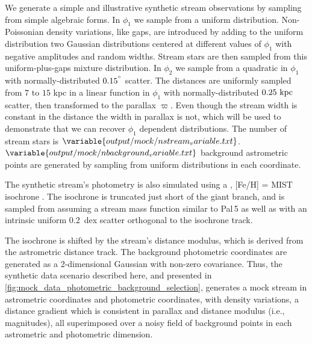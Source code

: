 \documentclass[twocolumn]{aastex631}
\newcommand{\stream}[1]{#1}
\newcommand{\parallax}{\varpi}
\begin{document}
        We generate a simple and illustrative synthetic stream observations by
        sampling from simple algebraic forms.  In $\phi_1$ we sample from a
        uniform distribution. Non-Poissonian density variations, like gaps, are
        introduced by adding to the uniform distribution two Gaussian
        distributions centered at different values of $\phi_1$ with negative
        amplitudes and random widths. Stream stars are then sampled from this
        uniform-plus-gaps mixture distribution.  In $\phi_2$ we sample from a
        quadratic in $\phi_1$ with normally-distributed $0.15^{\degree}$
        scatter.  The distances are uniformly sampled from $7$ to $15$ kpc in a
        linear function in $\phi_1$ with normally-distributed $0.25 \ \rm{kpc}$
        scatter, then transformed to the parallax $\parallax$. Even though the
        stream width is constant in the distance the width in parallax is not,
        which will be used to demonstrate that we can recover $\phi_1$ dependent
        distributions.  The number of stream stars is
        $\variable{output/mock/nstream_variable.txt}$.
        $\variable{output/mock/nbackground_variable.txt}$ background astrometric
        points are generated by sampling from uniform distributions in each
        coordinate.
    
        The synthetic stream's photometry is also simulated using a
        \unskip, [Fe/H] =
         MIST isochrone
        \citep{Dotter2016, Choi+2016,brutus}. The isochrone is truncated just
        short of the giant branch, and is sampled from assuming a stream mass
        function similar to \stream{Pal\,5} \citep{GrillmairSmith2001} as well
        as with an intrinsic uniform 0.2~dex scatter orthogonal to the isochrone
        track.

        The isochrone is shifted by the stream's distance modulus, which is
        derived from the astrometric distance track.  The background photometric
        coordinates are generated as a 2-dimensional Gaussian with non-zero
        covariance.  Thus, the synthetic data scenario described here, and
        presented in \autoref{fig:mock_data_photometric_background_selection},
        generates a mock stream in astrometric coordinates and photometric
        coordinates, with density variations, a distance gradient which is
        consistent in parallax and distance modulus (i.e., magnitudes), all
        superimposed over a noisy field of background points in each astrometric
        and photometric dimension.
\end{document}
